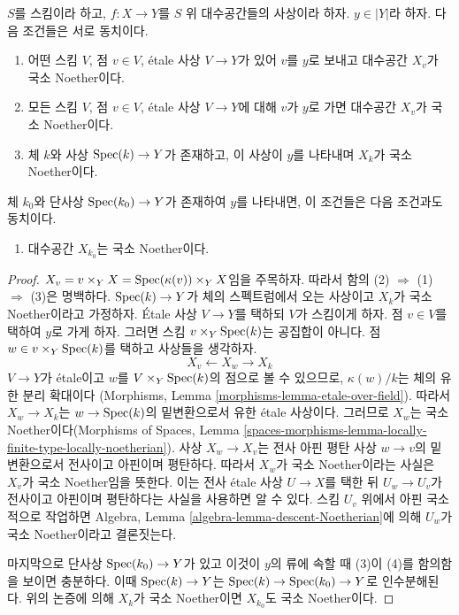 \begin{lemma}
\label{lemma-locally-noetherian-fibre}
$S$를 스킴이라 하고, $f : X \to Y$를 $S$ 위 대수공간들의 사상이라 하자.
$y \in |Y|$라 하자. 다음 조건들은 서로 동치이다.
\begin{enumerate}
\item 어떤 스킴 $V$, 점 $v \in V$, \'etale 사상 $V \to Y$가 있어
$v$를 $y$로 보내고 대수공간 $X_v$가 국소 Noether이다.
\item 모든 스킴 $V$, 점 $v \in V$, \'etale 사상 $V \to Y$에 대해
$v$가 $y$로 가면 대수공간 $X_v$가 국소 Noether이다.
\item 체 $k$와 사상 $\mathop{\mathrm{Spec}}(k) \to Y$가 존재하고, 이 사상이 $y$를
나타내며 $X_k$가 국소 Noether이다.
\end{enumerate}
체 $k_0$와 단사상 $\mathop{\mathrm{Spec}}(k_0) \to Y$가 존재하여 $y$를 나타내면,
이 조건들은 다음 조건과도 동치이다.
\begin{enumerate}
\item[(4)] 대수공간 $X_{k_0}$는 국소 Noether이다.
\end{enumerate}
\end{lemma}

\begin{proof}
$X_v = v \times_Y X = \mathop{\mathrm{Spec}}(\kappa(v)) \times_Y X$임을 주목하자.
따라서 함의 (2) $\Rightarrow$ (1) $\Rightarrow$ (3)은 명백하다.
$\mathop{\mathrm{Spec}}(k) \to Y$가 체의 스펙트럼에서 오는 사상이고
$X_k$가 국소 Noether이라고 가정하자. \'Etale 사상
$V \to Y$를 택하되 $V$가 스킴이게 하자. 점 $v \in V$를 택하여
$y$로 가게 하자.
그러면 스킴 $v \times_Y \mathop{\mathrm{Spec}}(k)$는 공집합이 아니다.
점 $w \in v \times_Y \mathop{\mathrm{Spec}}(k)$를 택하고 사상들을 생각하자.
$$
X_v \longleftarrow X_w \longrightarrow X_k
$$
$V \to Y$가 \'etale이고 $w$를 $V \times_Y \mathop{\mathrm{Spec}}(k)$의 점으로 볼 수
있으므로, $\kappa(w)/k$는 체의 유한 분리 확대이다
(Morphisms, Lemma \ref{morphisms-lemma-etale-over-field}).
따라서 $X_w \to X_k$는 $w \to \mathop{\mathrm{Spec}}(k)$의 밑변환으로서 유한 \'etale
사상이다. 그러므로 $X_w$는 국소 Noether이다(Morphisms of Spaces, Lemma
\ref{spaces-morphisms-lemma-locally-finite-type-locally-noetherian}).
사상 $X_w \to X_v$는 전사 아핀 평탄 사상 $w \to v$의 밑변환으로서
전사이고 아핀이며 평탄하다. 따라서 $X_w$가 국소 Noether이라는 사실은
$X_v$가 국소 Noether임을 뜻한다. 이는 전사 \'etale 사상 $U \to X$를
택한 뒤 $U_w \to U_v$가 전사이고 아핀이며 평탄하다는 사실을 사용하면
알 수 있다. 스킴 $U_v$ 위에서 아핀 국소적으로 작업하면 Algebra, Lemma
\ref{algebra-lemma-descent-Noetherian}에 의해 $U_w$가 국소 Noether이라고
결론짓는다.

\medskip\noindent
마지막으로 단사상 $\mathop{\mathrm{Spec}}(k_0) \to Y$가 있고 이것이 $y$의 류에 속할 때
(3)이 (4)를 함의함을 보이면 충분하다. 이때 $\mathop{\mathrm{Spec}}(k) \to Y$는
$\mathop{\mathrm{Spec}}(k) \to \mathop{\mathrm{Spec}}(k_0) \to Y$로 인수분해된다. 위의 논증에 의해
$X_k$가 국소 Noether이면 $X_{k_0}$도 국소 Noether이다.
\end{proof}

